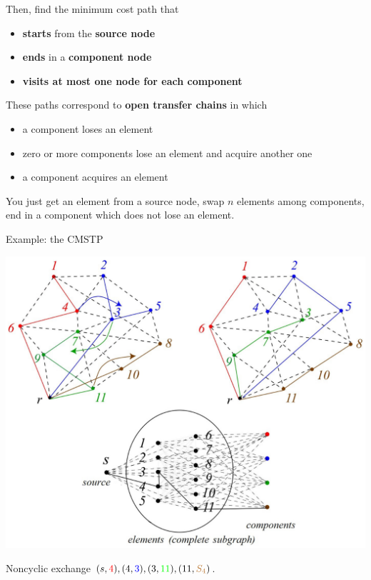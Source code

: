 \documentclass[11pt]{article}
\begin{document}
	Then, find the minimum cost path that
	\begin{itemize}
		\item \textbf{starts} from the \textbf{source node}
		
		\item \textbf{ends} in a \textbf{component node}
		
		\item \textbf{visits at most one node for each component}
	\end{itemize}
	
	These paths correspond to \textbf{open transfer chains} in which
	\begin{itemize}
		\item a component loses an element
		
		\item zero or more components lose an element and acquire another one
		
		\item a component acquires an element
	\end{itemize}
	
	You just get an element from a source node, swap $n$ elements among components, end in a component which does not lose an element.\\
	
	\newpage
	
	Example: the CMSTP
	\begin{center}
		\includegraphics[width=0.9\columnwidth]{img/CMSTP2}
	\end{center}
	Noncyclic exchange $(s, {\color{red} 4}), (4, {\color{blue} 3}), (3, {\color{green} 11}), (11, {\color{brown} S_4})$.\\
	
\end{document}
